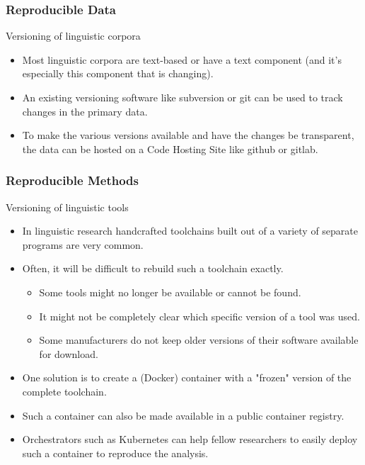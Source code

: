 \documentclass[]{beamer}
\begin{document}
    \begin{frame}
        \frametitle{Reproducible Data}
        \begin{block}{Versioning of linguistic corpora}
            \begin{itemize}
				\item Most linguistic corpora are text-based or have a text component (and it's especially this component that is changing).
				\pause
				\item An existing versioning software like subversion or git can be used to track changes in the primary data.
				\pause
				\item To make the various versions available and have the changes be transparent, the data can be hosted on a Code Hosting Site like github or gitlab.
	     	\end{itemize}
        \end{block}
    \end{frame}

    \begin{frame}
        \frametitle{Reproducible Methods}
        \begin{block}{Versioning of linguistic tools}
            \begin{itemize}
				\item In linguistic research handcrafted toolchains built out of a variety of separate programs are very common.
				\pause
				\item Often, it will be difficult to rebuild such a toolchain exactly.
				\pause
				\begin{itemize}
					\item Some tools might no longer be available or cannot be found.
					\pause
					\item It might not be completely clear which specific version of a tool was used.
					\pause
					\item Some manufacturers do not keep older versions of their software available for download.
				\end{itemize}
				\pause
				\item One solution is to create a (Docker) container with a "frozen" version of the complete toolchain.
				\pause
				\item Such a container can also be made available in a public container registry.
				\pause
				\item Orchestrators such as Kubernetes can help fellow researchers to easily deploy such a container to reproduce the analysis.
	     	\end{itemize}
        \end{block}
    \end{frame}
\end{document}
